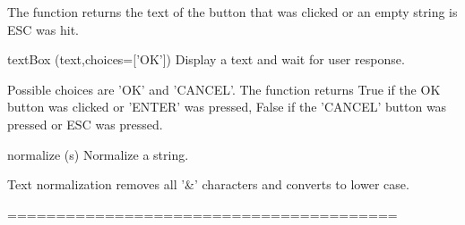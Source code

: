     The function returns the text of the button that was clicked or
    an empty string is ESC was hit.
    

textBox (text,choices=['OK'])
Display a text and wait for user response.

    Possible choices are 'OK' and 'CANCEL'.
    The function returns True if the OK button was clicked or 'ENTER'
    was pressed, False if the 'CANCEL' button was pressed or ESC was pressed.
    

normalize (s)
Normalize a string.

    Text normalization removes all '\&' characters and converts to lower case.
    
========================================

